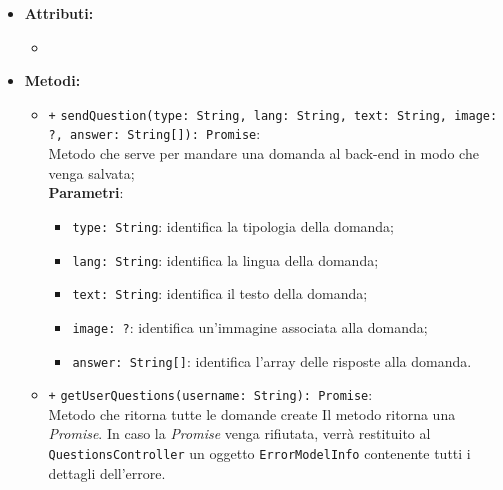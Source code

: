 \begin{itemize}
\begin{itemize}
	\end{itemize}
	\item \textbf{Attributi:}
	\begin{itemize}
		\item 
	\end{itemize}
	\item \textbf{Metodi:}
	\begin{itemize}
		\item \texttt{+} \texttt{sendQuestion(type: String, lang: String, text: String, image: ?, answer: String[]): Promise}: \\Metodo che serve per mandare una domanda al back-end in modo che venga salvata;\\ 
		\textbf{Parametri}: 
		\begin{itemize}
			\item \texttt{type: String}: identifica la tipologia della domanda;
			\item \texttt{lang: String}: identifica la lingua della domanda;
			\item \texttt{text: String}: identifica il testo della domanda;
			\item \texttt{image: ?}: identifica un'immagine associata alla domanda;
			\item \texttt{answer: String[]}: identifica l'array delle risposte alla domanda.
		\end{itemize}
		\item \texttt{+} \texttt{getUserQuestions(username: String): Promise}: \\Metodo che ritorna tutte le domande create Il metodo ritorna una \textit{Promise}. In caso la \textit{Promise} venga rifiutata, verrà restituito al \texttt{QuestionsController} un oggetto \texttt{ErrorModelInfo} contenente tutti i dettagli dell'errore. \\
	\end{itemize}
\end{itemize}

